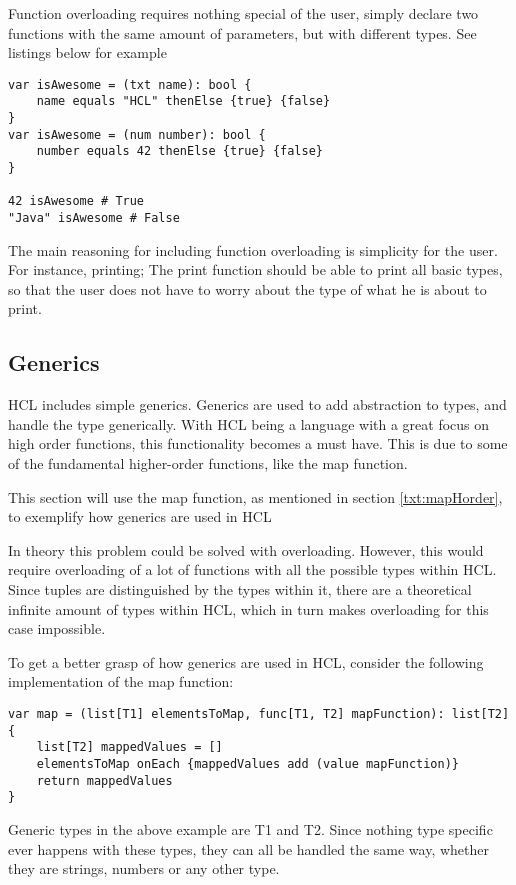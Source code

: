 Function overloading requires nothing special of the user, simply declare two functions with the same amount of parameters, but with different types. 
See listings below for example

\begin{lstlisting}[language=HCL,label=lis:hclTypeDcls,firstnumber=1]
var isAwesome = (txt name): bool {
	name equals "HCL" thenElse {true} {false}
}
var isAwesome = (num number): bool {
	number equals 42 thenElse {true} {false}
}

42 isAwesome # True
"Java" isAwesome # False
\end{lstlisting}

The main reasoning for including function overloading is simplicity for the user.
For instance, printing; 
The print function should be able to print all basic types, so that the user does not have to worry about the type of what he is about to print.

\subsection{Generics}
HCL includes simple generics.
Generics are used to add abstraction to types, and handle the type generically.
With HCL being a language with a great focus on high order functions, this functionality becomes a must have.
This is due to some of the fundamental higher-order functions, like the map function.

This section will use the map function, as mentioned in section \ref{txt:mapHorder}, to exemplify how generics are used in HCL

In theory this problem could be solved with overloading. 
However, this would require overloading of a lot of functions with all the possible types within HCL. 
Since tuples are distinguished by the types within it, there are a theoretical infinite amount of types within HCL, which in turn makes overloading for this case impossible.

To get a better grasp of how generics are used in HCL, consider the following implementation of the map function:
\begin{lstlisting}[language=HCL,label=lis:hclTypeDcls,firstnumber=1]
var map = (list[T1] elementsToMap, func[T1, T2] mapFunction): list[T2] {
	list[T2] mappedValues = []
	elementsToMap onEach {mappedValues add (value mapFunction)}
	return mappedValues
}
\end{lstlisting}

Generic types in the above example are T1 and T2. 
Since nothing type specific ever happens with these types, they can all be handled the same way, whether they are strings, numbers or any other type.
